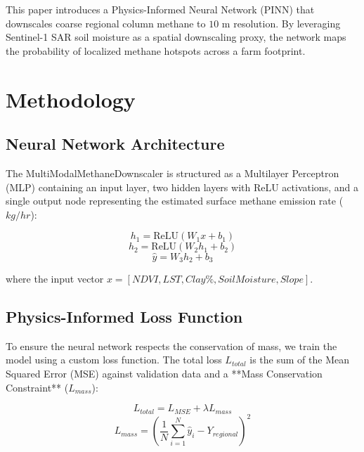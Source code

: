 \documentclass[sn-mathphys,Numbered]{sn-jnl}
\begin{document}
This paper introduces a Physics-Informed Neural Network (PINN) that downscales coarse regional column methane to $10\text{~m}$ resolution. By leveraging Sentinel-1 SAR soil moisture as a spatial downscaling proxy, the network maps the probability of localized methane hotspots across a farm footprint.

\section{Methodology}\label{sec:methods}

\subsection{Neural Network Architecture}
The MultiModalMethaneDownscaler is structured as a Multilayer Perceptron (MLP) containing an input layer, two hidden layers with ReLU activations, and a single output node representing the estimated surface methane emission rate ($kg/hr$):

\begin{equation}
    h_1 = \text{ReLU}(W_1 x + b_1)
\end{equation}
\begin{equation}
    h_2 = \text{ReLU}(W_2 h_1 + b_2)
\end{equation}
\begin{equation}
    \hat{y} = W_3 h_2 + b_3
\end{equation}

where the input vector $x = [NDVI, LST, Clay\%, Soil Moisture, Slope]$.

\subsection{Physics-Informed Loss Function}
To ensure the neural network respects the conservation of mass, we train the model using a custom loss function. The total loss $L_{total}$ is the sum of the Mean Squared Error (MSE) against validation data and a **Mass Conservation Constraint** ($L_{mass}$):

\begin{equation}
    L_{total} = L_{MSE} + \lambda L_{mass}
\end{equation}
\begin{equation}
    L_{mass} = \left( \frac{1}{N}\sum_{i=1}^{N} \hat{y}_i - Y_{regional} \right)^2
\end{equation}
\end{document}
